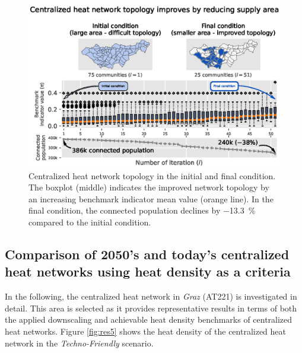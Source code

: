 \begin{figure}
	\centering
	\includegraphics[width=1\linewidth]{figures/4_Results/Fig_Boxplot/ext_boxplot.eps}
	\caption{Centralized heat network topology in the initial and final condition. The boxplot (middle) indicates the improved network topology by an increasing benchmark indicator mean value (orange line). In the final condition, the connected population declines by \SI{-13.3}{\%} compared to the initial condition.}
	\label{fig:res3}
\end{figure}

\subsection{Comparison of 2050's and today's centralized heat networks using heat density as a criteria}\label{res:5}
In the following, the centralized heat network in \textit{Graz} (AT221) is investigated in detail. This area is selected as it provides representative results in terms of both the applied downscaling and achievable heat density benchmarks of centralized heat networks. Figure \ref{fig:res5} shows the heat density of the centralized heat network in the \textit{Techno-Friendly} scenario. 

